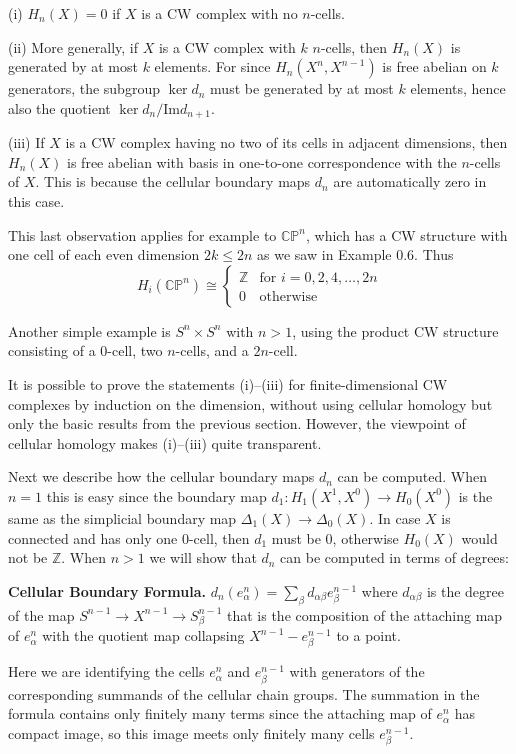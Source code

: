 (i) $H_n(X) = 0$ if $X$ is a CW complex with no $n$-cells.

(ii) More generally, if $X$ is a CW complex with $k$ $n$-cells, then $H_n(X)$ is generated by at most $k$ elements. For since $H_n(X^n, X^{n-1})$ is free abelian on $k$ generators, the subgroup $\ker d_n$ must be generated by at most $k$ elements, hence also the quotient $\ker d_n/\text{Im}d_{n+1}$.

(iii) If $X$ is a CW complex having no two of its cells in adjacent dimensions, then $H_n(X)$ is free abelian with basis in one-to-one correspondence with the $n$-cells of $X$. This is because the cellular boundary maps $d_n$ are automatically zero in this case.

This last observation applies for example to $\mathbb{CP}^n$, which has a CW structure with one cell of each even dimension $2k \le 2n$ as we saw in Example 0.6. Thus
\[
H_i(\mathbb{CP}^n) \cong \begin{cases} \mathbb{Z} & \text{for } i = 0,2,4,\ldots,2n \\ 0 & \text{otherwise} \end{cases}
\]

Another simple example is $S^n \times S^n$ with $n > 1$, using the product CW structure consisting of a 0-cell, two $n$-cells, and a $2n$-cell.

It is possible to prove the statements (i)--(iii) for finite-dimensional CW complexes by induction on the dimension, without using cellular homology but only the basic results from the previous section. However, the viewpoint of cellular homology makes (i)--(iii) quite transparent.

Next we describe how the cellular boundary maps $d_n$ can be computed. When $n = 1$ this is easy since the boundary map $d_1 : H_1(X^1, X^0) \to H_0(X^0)$ is the same as the simplicial boundary map $\Delta_1(X) \to \Delta_0(X)$. In case $X$ is connected and has only one 0-cell, then $d_1$ must be 0, otherwise $H_0(X)$ would not be $\mathbb{Z}$. When $n > 1$ we will show that $d_n$ can be computed in terms of degrees:

\textbf{Cellular Boundary Formula.} $d_n(e_\alpha^n) = \sum_\beta d_{\alpha\beta}e_\beta^{n-1}$ where $d_{\alpha\beta}$ is the degree of the map $S^{n-1} \to X^{n-1} \to S_\beta^{n-1}$ that is the composition of the attaching map of $e_\alpha^n$ with the quotient map collapsing $X^{n-1} - e_\beta^{n-1}$ to a point.

Here we are identifying the cells $e_\alpha^n$ and $e_\beta^{n-1}$ with generators of the corresponding summands of the cellular chain groups. The summation in the formula contains only finitely many terms since the attaching map of $e_\alpha^n$ has compact image, so this image meets only finitely many cells $e_\beta^{n-1}$.

